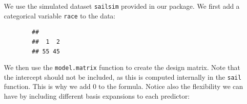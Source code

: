 			We use the simulated dataset \texttt{sailsim} provided in our package. We first add a categorical variable \texttt{race} to the data:
			
			\begin{knitrout}\scriptsize
			\color{fgcolor}\begin{kframe}
			\begin{alltt}
			\hlstd{(}\hlstd{)}
			 \hlkwb{<-} \hlopt{$}
			\hlopt{$} \hlkwb{<-} \hlstd{(}\hlstd{(}\hlopt{:}\hlstd{,}   \hlstd{=} \hlstd{))}
			\hlopt{$}
		\end{alltt}
		\begin{verbatim}
		## 
		##  1  2 
		## 55 45
		\end{verbatim}
	\end{kframe}
\end{knitrout}

We then use the \texttt{model.matrix} function to create the design matrix. Note that the intercept should not be included, as this is computed internally in the \texttt{sail} function. This is why we add 0 to the formula. Notice also the flexibility we can have by including different basis expansions to each predictor:

